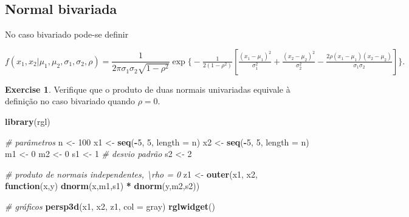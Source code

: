 \documentclass[
]{book}
\newenvironment{Shaded}{\begin{snugshade}}{\end{snugshade}}
\newcommand{\CommentTok}[1]{\textcolor[rgb]{0.56,0.35,0.01}{\textit{#1}}}
\newcommand{\ControlFlowTok}[1]{\textcolor[rgb]{0.13,0.29,0.53}{\textbf{#1}}}
\newcommand{\DataTypeTok}[1]{\textcolor[rgb]{0.13,0.29,0.53}{#1}}
\newcommand{\DecValTok}[1]{\textcolor[rgb]{0.00,0.00,0.81}{#1}}
\newcommand{\KeywordTok}[1]{\textcolor[rgb]{0.13,0.29,0.53}{\textbf{#1}}}
\newcommand{\NormalTok}[1]{#1}
\newcommand{\OperatorTok}[1]{\textcolor[rgb]{0.81,0.36,0.00}{\textbf{#1}}}
\newcommand{\StringTok}[1]{\textcolor[rgb]{0.31,0.60,0.02}{#1}}
\theoremstyle{definition}
\theoremstyle{definition}
\theoremstyle{definition}
\newtheorem{exercise}{Exercise}[chapter]
\theoremstyle{remark}
\begin{document}
\hypertarget{normal-bivariada}{%
\subsection{Normal bivariada}\label{normal-bivariada}}

No caso bivariado pode-se definir

\(f(x_1,x_2|\mu_1, \mu_2, \sigma_1, \sigma_2, \rho) = \dfrac{1}{2\pi \sigma_1 \sigma_2 \sqrt{1-\rho^2}} \exp \bigg\{ -\frac{1}{2(1-\rho^2)} \left[ \frac{(x_1-\mu_1)^2}{\sigma^2_1} + \frac{(x_2-\mu_2)^2}{\sigma^2_2} - \frac{2 \rho (x_1 - \mu_1) (x_2 - \mu_2)}{\sigma_1 \sigma_2} \right] \bigg\}.\)

\begin{exercise}
\protect\hypertarget{exr:unnamed-chunk-40}{}{\label{exr:unnamed-chunk-40} }Verifique que o produto de duas normais univariadas equivale à definição no caso bivariado quando \(\rho=0\).
\end{exercise}

\begin{Shaded}
\begin{Highlighting}[]
\KeywordTok{library}\NormalTok{(rgl)}

\CommentTok{\# parâmetros}
\NormalTok{n \textless{}{-}}\StringTok{ }\DecValTok{100}
\NormalTok{x1 \textless{}{-}}\StringTok{ }\KeywordTok{seq}\NormalTok{(}\OperatorTok{{-}}\DecValTok{5}\NormalTok{, }\DecValTok{5}\NormalTok{, }\DataTypeTok{length =}\NormalTok{ n)}
\NormalTok{x2 \textless{}{-}}\StringTok{ }\KeywordTok{seq}\NormalTok{(}\OperatorTok{{-}}\DecValTok{5}\NormalTok{, }\DecValTok{5}\NormalTok{, }\DataTypeTok{length =}\NormalTok{ n)}
\NormalTok{m1 \textless{}{-}}\StringTok{ }\DecValTok{0}
\NormalTok{m2 \textless{}{-}}\StringTok{ }\DecValTok{0}
\NormalTok{s1 \textless{}{-}}\StringTok{ }\DecValTok{1}  \CommentTok{\# desvio padrão}
\NormalTok{s2 \textless{}{-}}\StringTok{ }\DecValTok{2}

\CommentTok{\# produto de normais independentes, \textbackslash{}rho = 0}
\NormalTok{z1 \textless{}{-}}\StringTok{ }\KeywordTok{outer}\NormalTok{(x1, x2, }\ControlFlowTok{function}\NormalTok{(x,y) }\KeywordTok{dnorm}\NormalTok{(x,m1,s1) }\OperatorTok{*}\StringTok{ }\KeywordTok{dnorm}\NormalTok{(y,m2,s2))}

\CommentTok{\# gráficos}
\KeywordTok{persp3d}\NormalTok{(x1, x2, z1, }\DataTypeTok{col =} \StringTok{\textquotesingle{}gray\textquotesingle{}}\NormalTok{)}
\KeywordTok{rglwidget}\NormalTok{()}
\end{Highlighting}
\end{Shaded}
\end{document}
